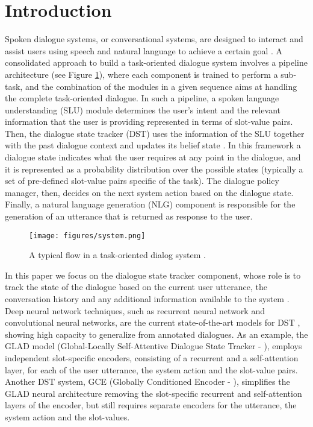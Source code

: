 \documentclass{article}
\begin{document}
\section{Introduction}
\label{sec:intro}
Spoken dialogue systems, or conversational systems, are designed to interact and assist users using speech and natural language to achieve a certain goal \cite{Henderson2015}.
A consolidated approach to build a task-oriented dialogue system involves a pipeline architecture (see Figure \ref{fig:system}), where each component is trained to perform a sub-task, and the combination of the modules in a given sequence aims at handling the complete task-oriented dialogue.  In such a pipeline, a spoken language understanding (SLU) module determines the user's intent and the relevant information that the user is providing represented in terms of slot-value pairs. Then, the dialogue state tracker (DST) uses the information of the SLU together with the past dialogue context and updates its belief state \cite{Wang2013, Sun2015a}. In this framework a dialogue state indicates what the user requires at any point in the dialogue, and it is represented as a probability distribution over the possible states (typically a set of pre-defined slot-value pairs specific of the task). The dialogue policy manager, then, decides on the next system action based on the dialogue state. Finally, a natural language generation (NLG) component is responsible for the generation of an utterance that is returned as response to the user.

\begin{figure}
    \centering
    \texttt{[image: figures/system.png]}
    \caption{A typical flow in a task-oriented dialog system \cite{Young2013}.}
    \label{fig:system}
\end{figure}

In this paper we focus on the dialogue state tracker component, whose role is to track the state of the dialogue based on the current user utterance, the conversation history and any additional information available to the system \cite{Henderson2015}. 
Deep neural network techniques, such as recurrent neural network and convolutional neural networks, are the current state-of-the-art models for DST \cite{Henderson2014, Wen2017, NBT, Ren2018, GLAD}, showing high capacity to generalize from annotated dialogues. As an example, the GLAD model (Global-Locally Self-Attentive Dialogue State Tracker - \cite{GLAD}),  employs independent slot-specific encoders, consisting of a recurrent and a self-attention layer, for each of the user utterance, the system action and the slot-value pairs. Another DST system, GCE (Globally Conditioned Encoder - \cite{GCE}), simplifies the GLAD neural architecture removing the slot-specific recurrent and self-attention layers of the encoder, but still requires separate encoders for the utterance, the system action and the slot-values.
\end{document}
